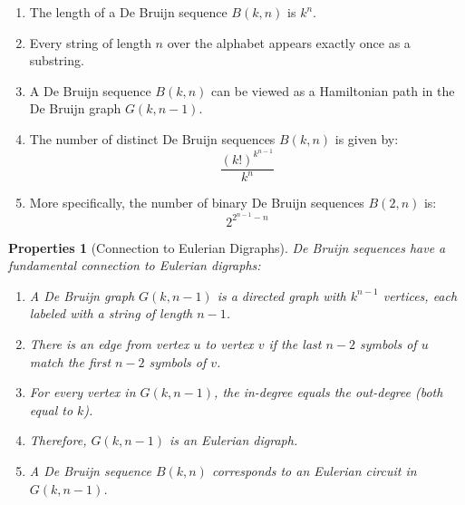 \documentclass{article}
\newtheorem{properties}{Properties}
\theoremstyle{definition}
\begin{document}
\begin{enumerate}
    \item The length of a De Bruijn sequence $B(k, n)$ is $k^n$.
    
    \item Every string of length $n$ over the alphabet appears exactly once as a substring.
    
    \item A De Bruijn sequence $B(k, n)$ can be viewed as a Hamiltonian path in the De Bruijn graph $G(k, n-1)$.
    
    \item The number of distinct De Bruijn sequences $B(k, n)$ is given by:
    \begin{equation}
        \frac{(k!)^{k^{n-1}}}{k^n}
    \end{equation}
    
    \item More specifically, the number of binary De Bruijn sequences $B(2, n)$ is:
    \begin{equation}
        2^{2^{n-1}-n}
    \end{equation}
\end{enumerate}

\begin{properties}[Connection to Eulerian Digraphs]
De Bruijn sequences have a fundamental connection to Eulerian digraphs:
\begin{enumerate}
    \item A De Bruijn graph $G(k, n-1)$ is a directed graph with $k^{n-1}$ vertices, each labeled with a string of length $n-1$.
    \item There is an edge from vertex $u$ to vertex $v$ if the last $n-2$ symbols of $u$ match the first $n-2$ symbols of $v$.
    \item For every vertex in $G(k, n-1)$, the in-degree equals the out-degree (both equal to $k$).
    \item Therefore, $G(k, n-1)$ is an Eulerian digraph.
    \item A De Bruijn sequence $B(k, n)$ corresponds to an Eulerian circuit in $G(k, n-1)$.
\end{enumerate}
\end{properties}
\end{document}
